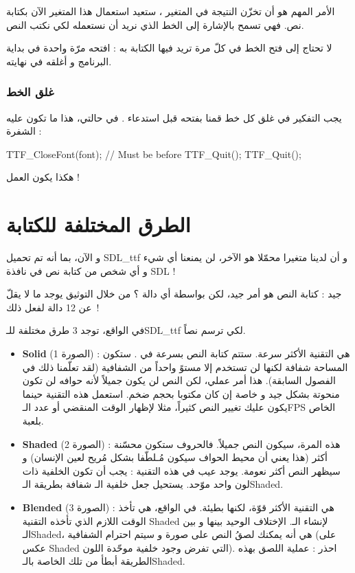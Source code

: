 الأمر المهم هو أن
تخزّن النتيجة في المتغير
،
ستعيد استعمال هذا المتغير الآن بكتابة نص. فهي تسمح بالإشارة إلى الخط الذي نريد أن نستعمله لكي نكتب النص.

\begin{information}
لا تحتاج إلى فتح الخط في كلّ مرة تريد فيها الكتابة به : افتحه مرّة واحدة في بداية البرنامج و أغلقه في نهايته.
\end{information}

\subsubsection{غلق الخط}

يجب التفكير في غلق كل خط قمنا بفتحه قبل استدعاء
.
في حالتي، هذا ما تكون عليه الشفرة :

\begin{Csource}
TTF_CloseFont(font); // Must be before TTF_Quit();
TTF_Quit();
\end{Csource}

هكذا يكون العمل !

\section{الطرق المختلفة للكتابة}

و الآن، بما أنه تم تحميل
\textenglish{SDL\_ttf}
و أن لدينا متغيرا 
محمّلا هو الآخر، لن يمنعنا أي شيء و أي شخص من كتابة نص في نافذة 
\textenglish{SDL} !

جيد : كتابة النص هو أمر جيد، لكن بواسطة أي دالة ؟ من خلال التوثيق يوجد ما لا يقلّ عن 12 دالة لفعل ذلك~!

في الواقع، توجد 3 طرق مختلفة للـ\textenglish{SDL\_ttf}
لكي ترسم نصاً.


\begin{itemize}
	\item \textbf{\textenglish{Solid}}
	(الصورة 1) : هي التقنية الأكثر سرعة. ستتم كتابة النص بسرعة في
	.
	ستكون المساحة شفافة لكنها لن تستخدم إلا مستوً واحداً من الشفافية (لقد تعلّمنا ذلك في الفصول السابقة). هذا أمر عملي، لكن النص لن يكون جميلاً لأنه حوافه لن تكون منحوتة بشكل جيد و خاصة إن كان مكتوبا بحجم ضخم. استعمل هذه التقنية حينما يكون عليك تغيير النص كثيراً، مثلا لإظهار الوقت المنقضي أو عدد الـ\textenglish{FPS}
	الخاص بلعبة.
	\item \textbf{\textenglish{Shaded}}
	(الصورة 2) : هذه المرة، سيكون النص جميلاً. فالحروف ستكون محسّنة أكثر (هذا يعني أن محيط الحواف سيكون مُـلطّفا بشكل مُريح لعين الإنسان) و سيظهر النص أكثر نعومة. يوجد عيب في هذه التقنية : يجب أن تكون الخلفية ذات لون واحد موّحد. يستحيل جعل خلفية الـ
	شفافة بطريقة الـ\textenglish{Shaded}.
	\item \textbf{\textenglish{Blended}}
	(الصورة 3) : هي التقنية الأكثر قوّة، لكنها بطيئة. في الواقع، هي تأخذ الوقت اللازم الذي تأخذه التقنية 
	\textenglish{Shaded}
	لإنشاء الـ.
	الإختلاف الوحيد بينها و بين الـ\textenglish{Shaded}،
	هي أنه يمكنك لصقُ النص على صورة و سيتم احترام الشفافية (على عكس
	\textenglish{Shaded}
	التي تفرض وجود خلفية موحّدة اللون). احذر : عملية اللصق بهذه الطريقة أبطأ من تلك الخاصة بالـ\textenglish{Shaded}.
\end{itemize}

